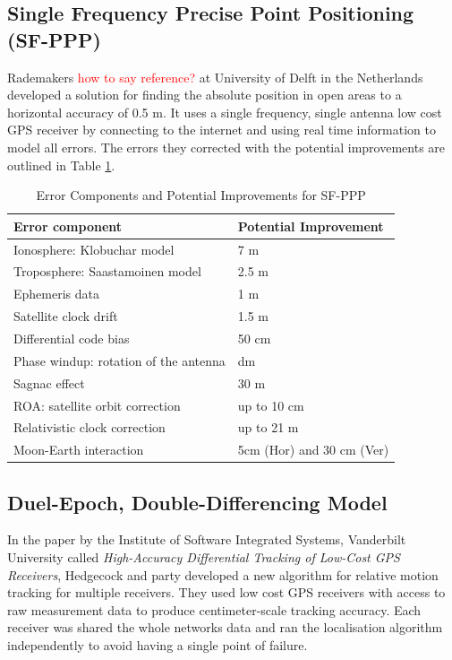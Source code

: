 \subsection{Single Frequency Precise Point Positioning (SF-PPP)}
Rademakers \textcolor{red}{how to say reference?} at University of Delft in the Netherlands developed a solution for finding the absolute position in open areas to a horizontal accuracy of 0.5 m. It uses a single frequency, single antenna low cost GPS receiver by connecting to the internet and using real time information to model all errors. The errors they corrected with the potential improvements are outlined in Table \ref{Table:SFPPP error table}. 
\begin{table}
\centering
\caption{Error Components and Potential Improvements for SF-PPP}
\label{Table:SFPPP error table}
\begin{tabular}{|l|l|}
\hline
\textbf{Error component} &\textbf{ Potential Improvement} \\\hline
 Ionosphere: Klobuchar model & 7 m \\\hline
 Troposphere: Saastamoinen model & 2.5 m \\\hline
Ephemeris data &  1 m \\\hline
 Satellite clock drift & 1.5 m \\\hline
 Differential code bias & 50 cm \\\hline
 Phase windup: rotation of the antenna & dm \\\hline
 Sagnac effect & 30 m \\\hline
 ROA: satellite orbit correction & up to 10 cm \\\hline
 Relativistic clock correction & up to 21 m \\\hline
 Moon-Earth interaction & 5cm (Hor) and 30 cm (Ver)\\\hline
\end{tabular}
\end{table}


\subsection{Duel-Epoch, Double-Differencing Model} \label{DEDD}
In the paper by the Institute of Software Integrated Systems, Vanderbilt University called \textit{High-Accuracy Differential Tracking of Low-Cost GPS Receivers}, Hedgecock and party developed a new algorithm for relative motion tracking for multiple receivers. They used low cost GPS receivers with access to raw measurement data to produce centimeter-scale tracking accuracy. Each receiver was shared the whole networks data and ran the localisation algorithm independently to avoid having a single point of failure.\\

